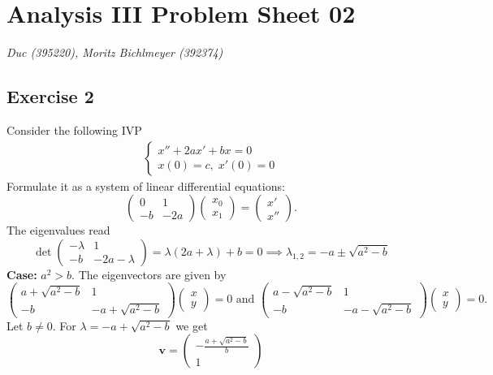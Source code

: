 \documentclass[a4paper]{article}
\begin{document}
\section*{Analysis III Problem Sheet 02}
\textit{Duc (395220), Moritz Bichlmeyer (392374)}

\subsection*{Exercise 2}
Consider the following IVP
\begin{align*}
\begin{cases}
	x'' + 2ax' + bx = 0 \\
	x(0) = c, \; x'(0) = 0
\end{cases}
\end{align*}
Formulate it as a system of linear differential equations:
\[
	\begin{pmatrix}
		0 & 1 \\
		-b & -2a
	\end{pmatrix} \begin{pmatrix}
		x_0 \\ x_1
	\end{pmatrix} = \begin{pmatrix}
		x' \\ x''
	\end{pmatrix}.
\]
The eigenvalues read
\[
	\det \begin{pmatrix}
		-\lambda & 1 \\
		-b & -2a-\lambda
	\end{pmatrix} = \lambda(2a + \lambda) + b = 0 \implies \lambda_{1,2} = -a \pm \sqrt{a^2 - b}
\]
\textbf{Case:} $a^2 > b$. The eigenvectors are given by
\[
	\begin{pmatrix}
		a + \sqrt{a^2 - b} & 1 \\
		-b & -a + \sqrt{a^2 - b}
	\end{pmatrix} \begin{pmatrix}
		x \\ y
	\end{pmatrix} = 0 \text{ and } \begin{pmatrix}
		a - \sqrt{a^2 - b} & 1 \\
		-b & -a - \sqrt{a^2 - b}
	\end{pmatrix} \begin{pmatrix}
		x \\ y
	\end{pmatrix} = 0.
\]
Let $b \neq 0$. For $\lambda = -a + \sqrt{a^2 - b}$ we get
\[
	\mathbf v = \begin{pmatrix}
		- \frac{a + \sqrt{a^2-b}}{b} \\ 1
	\end{pmatrix}
\]
\end{document}
